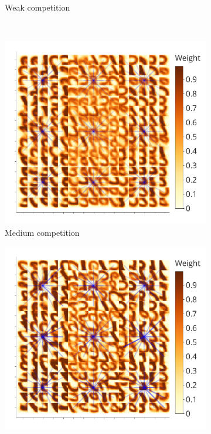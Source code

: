 \documentclass[a4paper]{article}
\begin{document}
\begin{figure}
\begin{subfigure}{0.45\textwidth}
    \caption{Weak competition}
    \label{fig:medium_bad_competition_distribution}
\end{subfigure}
\\
\begin{subfigure}{0.45\textwidth}
    \includegraphics[width=\textwidth,keepaspectratio=true]{competition_on_XY_medium_good.pdf}
    \caption{Medium competition}
    \label{fig:medium_good_competition_distribution}
\end{subfigure}
\begin{subfigure}{0.45\textwidth} 
    \includegraphics[width=\textwidth,keepaspectratio=true]{competition_on_XY_best.pdf}

\end{subfigure}
\end{figure}
\end{document}
